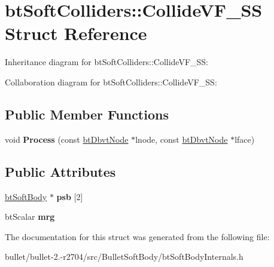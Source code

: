 \hypertarget{structbt_soft_colliders_1_1_collide_v_f___s_s}{\section{bt\+Soft\+Colliders\+:\+:Collide\+V\+F\+\_\+\+S\+S Struct Reference}
\label{structbt_soft_colliders_1_1_collide_v_f___s_s}
}


Inheritance diagram for bt\+Soft\+Colliders\+:\+:Collide\+V\+F\+\_\+\+S\+S\+:


Collaboration diagram for bt\+Soft\+Colliders\+:\+:Collide\+V\+F\+\_\+\+S\+S\+:
\subsection*{Public Member Functions}
\begin{DoxyCompactItemize}
\item 
\hypertarget{structbt_soft_colliders_1_1_collide_v_f___s_s_a4c2a3351388fbad778a63dbb3a84564b}{void {\bfseries Process} (const \hyperlink{structbt_dbvt_node}{bt\+Dbvt\+Node} $\ast$lnode, const \hyperlink{structbt_dbvt_node}{bt\+Dbvt\+Node} $\ast$lface)}\label{structbt_soft_colliders_1_1_collide_v_f___s_s_a4c2a3351388fbad778a63dbb3a84564b}

\end{DoxyCompactItemize}
\subsection*{Public Attributes}
\begin{DoxyCompactItemize}
\item 
\hypertarget{structbt_soft_colliders_1_1_collide_v_f___s_s_a98877778cb52b9599e6ea13d1b6cdeb6}{\hyperlink{classbt_soft_body}{bt\+Soft\+Body} $\ast$ {\bfseries psb} \mbox{[}2\mbox{]}}\label{structbt_soft_colliders_1_1_collide_v_f___s_s_a98877778cb52b9599e6ea13d1b6cdeb6}

\item 
\hypertarget{structbt_soft_colliders_1_1_collide_v_f___s_s_afddd3ce943cf462b9fa616277d9cea9d}{bt\+Scalar {\bfseries mrg}}\label{structbt_soft_colliders_1_1_collide_v_f___s_s_afddd3ce943cf462b9fa616277d9cea9d}

\end{DoxyCompactItemize}


The documentation for this struct was generated from the following file\+:\begin{DoxyCompactItemize}
\item 
bullet/bullet-\/2.-\/r2704/src/\+Bullet\+Soft\+Body/bt\+Soft\+Body\+Internals.\+h\end{DoxyCompactItemize}
